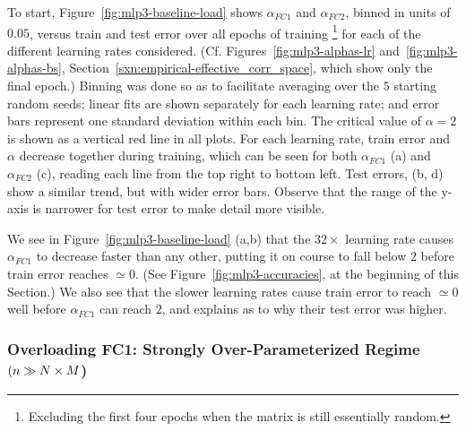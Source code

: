 To start, Figure~\ref{fig:mlp3-baseline-load} shows $\alpha_{FC1}$ and $\alpha_{FC2}$, binned in units of $0.05$, versus 
train and test error over all epochs of training
\footnote{Excluding the first four epochs when the matrix is still essentially random.} 
for each of the different learning rates considered. 
(Cf. Figures~\ref{fig:mlp3-alphas-lr} and~\ref{fig:mlp3-alphas-bs}, Section~\ref{sxn:empirical-effective_corr_space},
which show only the final epoch.)
Binning was done so as to facilitate averaging over the $5$ starting random seeds; 
linear fits are shown separately for each learning rate; and
error bars represent one standard deviation within each bin. 
The critical value of $\alpha=2$ is shown as a vertical red line in all plots. 
For each learning rate, train error and $\alpha$ decrease together during training, which can be seen for both 
$\alpha_{FC1}$ (a) and $\alpha_{FC2}$ (c), reading each line from the top right to bottom left. Test errors, (b, d) show 
a similar trend, but with wider error bars. 
Observe that the range of the y-axis is narrower for test error to make detail more visible.

We see in Figure~\ref{fig:mlp3-baseline-load} (a,b) 
that the $32\times$ learning rate causes $\alpha_{FC1}$ to decrease faster than any other, putting it on course to 
fall below $2$ before train error reaches $\simeq 0$. 
(See Figure~\ref{fig:mlp3-accuracies}, at the beginning of this Section.) 
We also see that the slower learning rates cause train error to reach $\simeq 0$ well before $\alpha_{FC1}$ can reach $2$, and explains as to why their test error was higher.



\subsubsection{Overloading FC1: {Strongly Over-Parameterized Regime} \texorpdfstring{$(n\gg N\times M$)}{n>>N x M}}
\label{sxn:hysteresis_effect_FC1}


